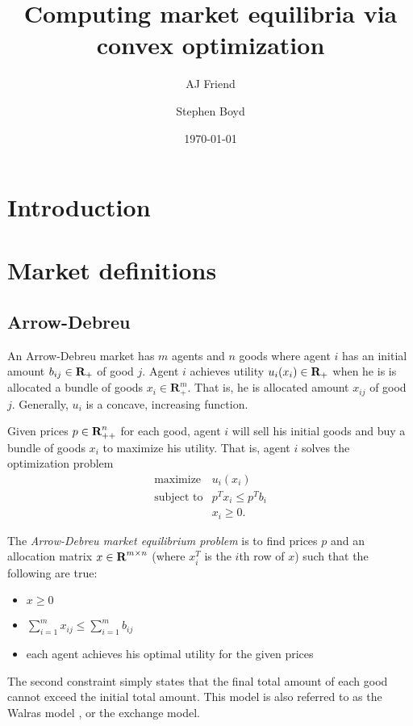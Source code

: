 \documentclass{article}
\title{Computing market equilibria via convex optimization}
\author{AJ Friend \and Stephen Boyd}
\date{\today}
\begin{document}
\maketitle

\listoftodos

\section{Introduction}

\section{Market definitions}
\subsection{Arrow-Debreu}

An Arrow-Debreu market has $m$ agents and $n$ goods where
agent $i$ has an initial amount $b_{ij} \in {\mbox{\bf R}}_+$ of good $j$.
Agent $i$ achieves utility $u_i(x_i) \in {\mbox{\bf R}}_+$ when he is is allocated a bundle of goods $x_i \in \mathbf{R}^m_{+}$.
That is, he is allocated amount $x_{ij}$ of good $j$.
Generally, $u_i$ is a concave, increasing function.

Given prices $p \in {\mbox{\bf R}}^n_{++}$ for each good, agent $i$ will sell his initial goods and buy a bundle of goods $x_i$ to maximize his utility.
That is, agent $i$ solves the optimization problem
\[
\begin{array}{ll}
\mbox{maximize} & u_i(x_i) \\
\mbox{subject to} & p^T x_i \leq p^T b_i \\
& x_i \geq 0.
\end{array}
\]

The \emph{Arrow-Debreu market equilibrium problem} is to find prices $p$ and an allocation matrix $x \in {\mbox{\bf R}}^{m \times n}$ (where $x_i^T$ is the $i$th row of $x$) such that the following are true:
\begin{itemize}
\item $x \geq 0$
\item $\sum_{i=1}^m x_{ij} \leq \sum_{i=1}^m b_{ij}$
\item each agent achieves his optimal utility for the given prices
\end{itemize}

The second constraint simply states that the final total amount of each good cannot exceed the initial total amount.
This model is also referred to as the Walras model \cite{walras1896elements}, or the exchange model.
\end{document}

